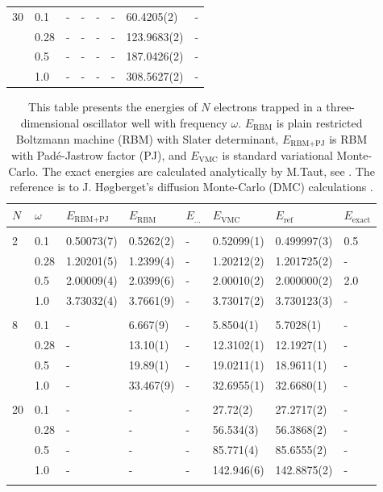 \begin{table} [H]
\begin{tabularx}{\textwidth}{l:l|XXXXXX}
		30 & 0.1 & - & - & - & - & 60.4205(2) & -\\ 
		& 0.28 & - & - & - & - & 123.9683(2) & - \\
		& 0.5 & - & - & - & - & 187.0426(2) & -\\
		& 1.0 & - & - & - & - & 308.5627(2) & -\\ \hline\hline
	\end{tabularx}
\end{table}

\begin{table} [H]
	\caption{This table presents the energies of $N$ electrons trapped in a three-dimensional oscillator well with frequency $\omega$. $E_{\text{RBM}}$ is plain restricted Boltzmann machine (RBM) with Slater determinant, $E_{\text{RBM+PJ}}$ is RBM with Padé-Jastrow factor (PJ), and $E_{\text{VMC}}$ is standard variational Monte-Carlo. The exact energies are calculated analytically by M.Taut, see \cite{taut_two_1993}. The reference is to J. Høgberget's diffusion Monte-Carlo (DMC) calculations \cite{hogberget_quantum_2013}. } 
	\begin{tabularx}{\textwidth}{l:l|XXXXXX} \hline\hline
		\label{tab:quantumdotswinteraction3D}
		$N$ & $\omega$ & $E_{\text{RBM+PJ}}$ & $E_{\text{RBM}}$ & $E_{\text{...}}$ & $E_{\text{VMC}}$ & $E_{\text{ref}} $ & $E_{\text{exact}}$ \\ \hline \\
		2 & 0.1 & 0.50073(7) & 0.5262(2) & - & 0.52099(1) & 0.499997(3) & 0.5 \\
		& 0.28 & 1.20201(5) & 1.2399(4) & - & 1.20212(2) & 1.201725(2) & - \\
		& 0.5 & 2.00009(4) & 2.0399(6) & - & 2.00010(2) & 2.000000(2) & 2.0 \\
		& 1.0 & 3.73032(4) & 3.7661(9) & - & 3.73017(2) & 3.730123(3) & - \\ \hdashline \\
		
		8 & 0.1 & - & 6.667(9) & - & 5.8504(1) & 5.7028(1) & -\\ 
		& 0.28 & - & 13.10(1) & - & 12.3102(1) & 12.1927(1) & -\\
		& 0.5 & - & 19.89(1) & - & 19.0211(1) & 18.9611(1) & -\\
		& 1.0 & - & 33.467(9) & - & 32.6955(1) & 32.6680(1) & -\\ \hdashline \\
		
		20 & 0.1 & - & - & - & 27.72(2) & 27.2717(2) & -\\ 
		& 0.28 & - & - & - & 56.534(3) & 56.3868(2) & -\\
		& 0.5 & - & - & - & 85.771(4) & 85.6555(2) & -\\
		& 1.0 & - & - & - & 142.946(6) & 142.8875(2) & -\\ \hdashline \\
		

\end{tabularx}
\end{table}
